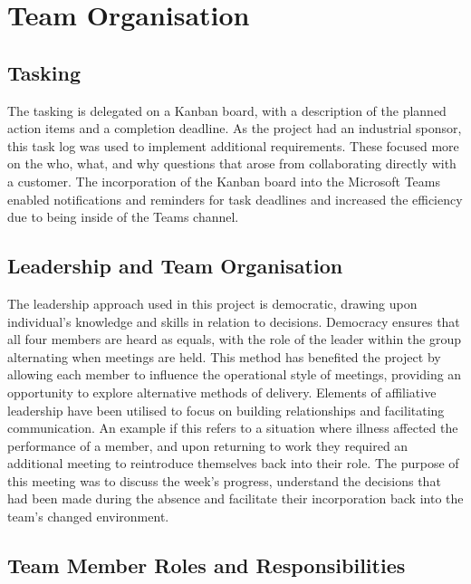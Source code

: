 \documentclass [12pt]{article}
\begin{document}
\section{Team Organisation}\label{sec:Team_Organisation}

\subsection{Tasking}\label{sec:Tasking}

The tasking is delegated on a Kanban board, with a description of the planned action items and a completion deadline. As the project had an industrial sponsor, this task log was used to implement additional requirements. These focused more on the who, what, and why questions that arose from collaborating directly with a customer. The incorporation of the Kanban board into the Microsoft Teams enabled notifications and reminders for task deadlines and increased the efficiency due to being inside of the Teams channel.

\subsection{Leadership and Team Organisation}\label{sec:Leadership_and_Team_Organisation}

The leadership approach used in this project is democratic, drawing upon individual’s knowledge and skills in relation to decisions. Democracy ensures that all four members are heard as equals, with the role of the leader within the group alternating when meetings are held. This method has benefited the project by allowing each member to influence the operational style of meetings, providing an opportunity to explore alternative methods of delivery. Elements of affiliative leadership have been utilised to focus on building relationships and facilitating communication. An example if this refers to a situation where illness affected the performance of a member, and upon returning to work they required an additional meeting to reintroduce themselves back into their role. The purpose of this meeting was to discuss the week’s progress, understand the decisions that had been made during the absence and facilitate their incorporation back into the team’s changed environment.

\subsection{Team Member Roles and Responsibilities}\label{sec:Team_Member_Roles_and_Responsibilities}
\end{document}
